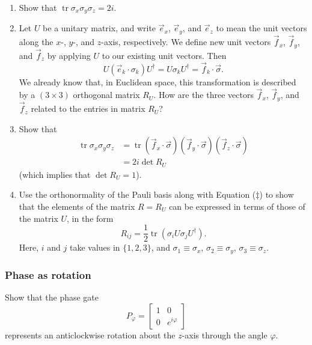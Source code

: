 \documentclass[fleqn]{article}
\begin{document}
\begin{enumerate}
\def\labelenumi{\arabic{enumi}.}
\item
  Show that \(\operatorname{tr}\sigma_x\sigma_y\sigma_z = 2i\).
\item
  Let \(U\) be a unitary matrix, and write \(\vec{e}_x\), \(\vec{e}_y\), and \(\vec{e}_z\) to mean the unit vectors along the \(x\)-, \(y\)-, and \(z\)-axis, respectively.
  We define new unit vectors \(\vec{f}_x\), \(\vec{f}_y\), and \(\vec{f}_z\) by applying \(U\) to our existing unit vectors.
  Then
  \[
     U(\vec{e}_k\cdot\sigma_k)U^\dagger=U\sigma_kU^\dagger={\vec{f}_k}\cdot\vec\sigma.
   \]
  We already know that, in Euclidean space, this transformation is described by a \((3\times 3)\) orthogonal matrix \(R_U\).
  How are the three vectors \(\vec{f}_x\), \(\vec{f}_y\), and \(\vec{f}_z\) related to the entries in matrix \(R_U\)?
\item
  Show that
  \[
     \begin{aligned}
       \operatorname{tr}\sigma_x\sigma_y\sigma_z
       &= \operatorname{tr}({\vec f_x}\cdot\vec\sigma)( {\vec f_y}\cdot\vec\sigma)({\vec f_z}\cdot\vec\sigma)
     \\&= 2i\det R_U
     \end{aligned}
   \]
  (which implies that \(\det R_U=1\)).
\item
  Use the orthonormality of the Pauli basis along with Equation (\(\ddagger\)) to show that the elements of the matrix \(R=R_U\) can be expressed in terms of those of the matrix \(U\), in the form
  \[
     R_{ij}=\frac{1}{2}\operatorname{tr}\left(\sigma_i U\sigma_j U^\dagger\right).
   \]
  Here, \(i\) and \(j\) take values in \(\{1,2,3\}\), and \(\sigma_1\equiv\sigma_x\), \(\sigma_2\equiv\sigma_y\), \(\sigma_3\equiv\sigma_z\).
\end{enumerate}

\hypertarget{phase-as-rotation}{%
\subsubsection{Phase as rotation}\label{phase-as-rotation}}

Show that the phase gate
\[
  P_\varphi = \begin{bmatrix}1&0\\0&e^{i\varphi}\end{bmatrix}
\]
represents an anticlockwise rotation about the \(z\)-axis through the angle \(\varphi\).
\end{document}
